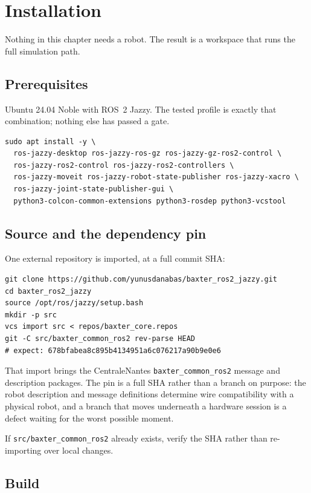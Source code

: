 \chapter{Installation}
\label{ch:install}

Nothing in this chapter needs a robot. The result is a workspace that runs the
full simulation path.

\section{Prerequisites}

Ubuntu 24.04 Noble with ROS~2 Jazzy. The tested profile is exactly that
combination; nothing else has passed a gate.

\begin{lstlisting}
sudo apt install -y \
  ros-jazzy-desktop ros-jazzy-ros-gz ros-jazzy-gz-ros2-control \
  ros-jazzy-ros2-control ros-jazzy-ros2-controllers \
  ros-jazzy-moveit ros-jazzy-robot-state-publisher ros-jazzy-xacro \
  ros-jazzy-joint-state-publisher-gui \
  python3-colcon-common-extensions python3-rosdep python3-vcstool
\end{lstlisting}

\section{Source and the dependency pin}

One external repository is imported, at a full commit SHA:

\begin{lstlisting}
git clone https://github.com/yunusdanabas/baxter_ros2_jazzy.git
cd baxter_ros2_jazzy
source /opt/ros/jazzy/setup.bash
mkdir -p src
vcs import src < repos/baxter_core.repos
git -C src/baxter_common_ros2 rev-parse HEAD
# expect: 678bfabea8c895b4134951a6c076217a90b9e0e6
\end{lstlisting}

That import brings the CentraleNantes \texttt{baxter\_common\_ros2} message and
description packages. The pin is a full SHA rather than a branch on purpose: the
robot description and message definitions determine wire compatibility with a
physical robot, and a branch that moves underneath a hardware session is a defect
waiting for the worst possible moment.

If \texttt{src/baxter\_common\_ros2} already exists, verify the SHA rather than
re-importing over local changes.

\section{Build}

